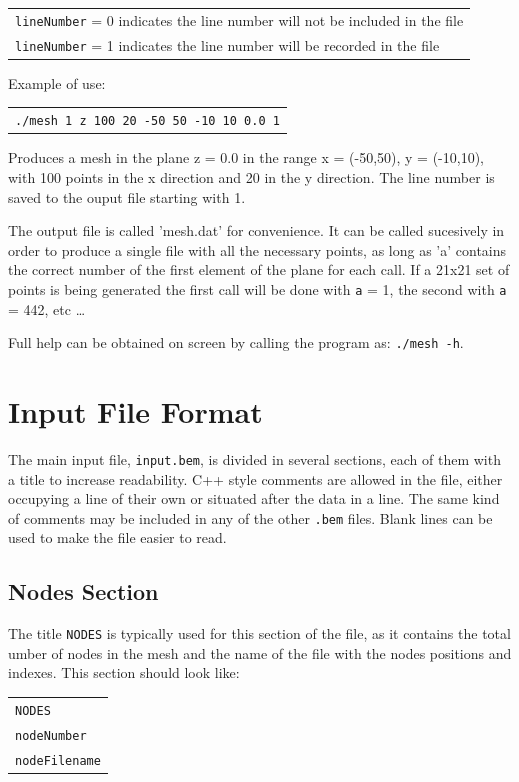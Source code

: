 \documentclass[12pt]{article}
\begin{document}
\begin{tabular}{l}
\texttt{lineNumber} = 0 indicates the line number will not be included in the file\\
\texttt{lineNumber} = 1 indicates the line number will be recorded in the file\\
\end{tabular}

Example of use:

\begin{tabular}{l}
\texttt{./mesh 1 z 100 20 -50 50 -10 10 0.0 1}
\end{tabular}

Produces a mesh in the plane z = 0.0 in the range x = (-50,50), y = (-10,10), with 100 points in the x direction and 20 in the y direction. The line number is saved to the ouput file starting with 1.

The output file is called 'mesh.dat' for convenience. It can be called sucesively in order to produce a single file with all the necessary points, as long as 'a' contains the correct number of the first element of the plane for each call. If a 21x21 set of points is being generated the first call will be done with \verb+a+ = 1, the second with \verb+a+ = 442, etc \ldots

Full help can be obtained on screen by calling the program as: \texttt{./mesh -h}.

\pagebreak

\section{Input File Format}
The main input file, \verb+input.bem+, is divided in several sections, each of them with a title to increase readability. C++ style comments are allowed in the file, either occupying a line of their own or situated after the data in a line. The same kind of comments may be included in any of the other \verb+.bem+ files. Blank lines can be used to make the file easier to read.

\subsection{Nodes Section}
The title \verb+NODES+ is typically used for this section of the file, as it contains the total umber of nodes in the mesh and the name of the file with the nodes positions and indexes. This section should look like:

\begin{tabular}{l}
\texttt{NODES}\\
\texttt{nodeNumber}\\
\texttt{nodeFilename}
\end{tabular}
\end{document}
